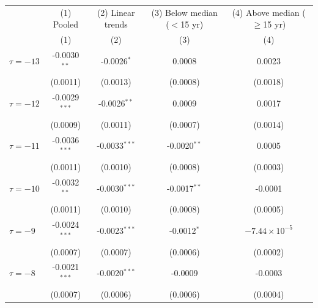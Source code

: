 
\begingroup
\centering
\begin{tabular}{lcccc}
   \toprule
                                                & (1) Pooled      & (2) Linear trends      & (3) Below median ($<$15 yr) & (4) Above median ($\geq$15 yr) \\    
                                                & (1)             & (2)                    & (3)                         & (4)\\  
   \midrule 
   $\tau = -13$                                 & -0.0030$^{**}$  & -0.0026$^{*}$          & 0.0008                      & 0.0023\\   
                                                & (0.0011)        & (0.0013)               & (0.0008)                    & (0.0018)\\   
   $\tau = -12$                                 & -0.0029$^{***}$ & -0.0026$^{**}$         & 0.0009                      & 0.0017\\   
                                                & (0.0009)        & (0.0011)               & (0.0007)                    & (0.0014)\\   
   $\tau = -11$                                 & -0.0036$^{***}$ & -0.0033$^{***}$        & -0.0020$^{**}$              & 0.0005\\   
                                                & (0.0011)        & (0.0010)               & (0.0008)                    & (0.0003)\\   
   $\tau = -10$                                 & -0.0032$^{**}$  & -0.0030$^{***}$        & -0.0017$^{**}$              & -0.0001\\   
                                                & (0.0011)        & (0.0010)               & (0.0008)                    & (0.0005)\\   
   $\tau = -9$                                  & -0.0024$^{***}$ & -0.0023$^{***}$        & -0.0012$^{*}$               & $-7.44\times 10^{-5}$\\    
                                                & (0.0007)        & (0.0007)               & (0.0006)                    & (0.0002)\\   
   $\tau = -8$                                  & -0.0021$^{***}$ & -0.0020$^{***}$        & -0.0009                     & -0.0003\\   
                                                & (0.0007)        & (0.0006)               & (0.0006)                    & (0.0004)\\   

\end{tabular}
